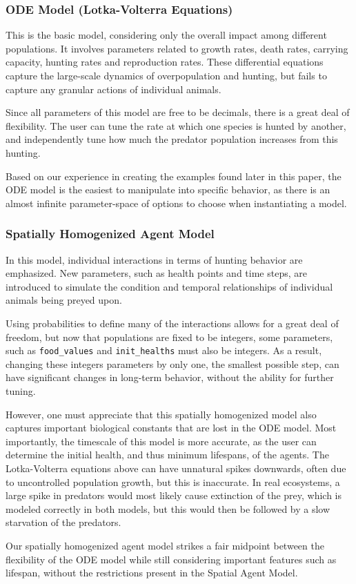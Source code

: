 \documentclass[journal]{IEEEtran}
\begin{document}
\subsubsection{ODE Model (Lotka-Volterra Equations)}
This is the basic model, considering only the overall impact among different populations. It involves parameters related to growth rates, death rates, carrying capacity, hunting rates and reproduction rates. These differential equations capture the large-scale dynamics of overpopulation and hunting, but fails to capture any granular actions of individual animals.\par
Since all parameters of this model are free to be decimals, there is a great deal of flexibility. The user can tune the rate at which one species is hunted by another, and independently tune how much the predator population increases from this hunting.\par
Based on our experience in creating the examples found later in this paper, the ODE model is the easiest to manipulate into specific behavior, as there is an almost infinite parameter-space of options to choose when instantiating a model.

\subsubsection{Spatially Homogenized Agent Model}
In this model, individual interactions in terms of hunting behavior are emphasized. New parameters, such as health points and time steps, are introduced to simulate the condition and temporal relationships of individual animals being preyed upon.\par
Using probabilities to define many of the interactions allows for a great deal of freedom, but now that populations are fixed to be integers, some parameters, such as \verb|food_values| and \verb|init_healths| must also be integers. As a result, changing these integers parameters by only one, the smallest possible step, can have significant changes in long-term behavior, without the ability for further tuning.\par
However, one must appreciate that this spatially homogenized model also captures important biological constants that are lost in the ODE model. Most importantly, the timescale of this model is more accurate, as the user can determine the initial health, and thus minimum lifespans, of the agents. The Lotka-Volterra equations above can have unnatural spikes downwards, often due to uncontrolled population growth, but this is inaccurate. In real ecosystems, a large spike in predators would most likely cause extinction of the prey, which is modeled correctly in both models, but this would then be followed by a slow starvation of the predators.\par
Our spatially homogenized agent model strikes a fair midpoint between the flexibility of the ODE model while still considering important features such as lifespan, without the restrictions present in the Spatial Agent Model.
\end{document}
